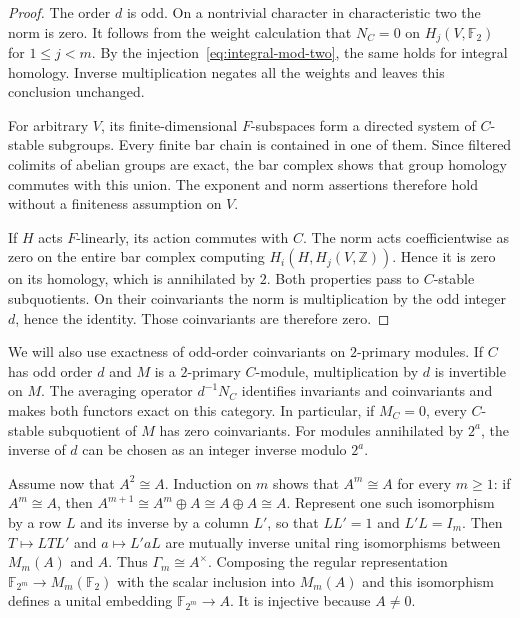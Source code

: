 \documentclass[11pt]{amsart}
\newcommand{\Z}{\mathbb Z}
\newcommand{\F}{\mathbb F}
\theoremstyle{definition}
\theoremstyle{remark}
\numberwithin{equation}{section}
\begin{document}
\begin{proof}
The order $d$ is odd. On a nontrivial character in characteristic two the norm is zero. It follows from the weight calculation that $N_C=0$ on $H_j(V,\F_2)$ for $1\leq j<m$. By the injection~\eqref{eq:integral-mod-two}, the same holds for integral homology. Inverse multiplication negates all the weights and leaves this conclusion unchanged.

For arbitrary $V$, its finite-dimensional $F$-subspaces form a directed system of $C$-stable subgroups. Every finite bar chain is contained in one of them. Since filtered colimits of abelian groups are exact, the bar complex shows that group homology commutes with this union. The exponent and norm assertions therefore hold without a finiteness assumption on $V$.

If $H$ acts $F$-linearly, its action commutes with $C$. The norm acts coefficientwise as zero on the entire bar complex computing $H_i(H,H_j(V,\Z))$. Hence it is zero on its homology, which is annihilated by $2$. Both properties pass to $C$-stable subquotients. On their coinvariants the norm is multiplication by the odd integer $d$, hence the identity. Those coinvariants are therefore zero.
\end{proof}

We will also use exactness of odd-order coinvariants on $2$-primary modules. If $C$ has odd order $d$ and $M$ is a $2$-primary $C$-module, multiplication by $d$ is invertible on $M$. The averaging operator $d^{-1}N_C$ identifies invariants and coinvariants and makes both functors exact on this category. In particular, if $M_C=0$, every $C$-stable subquotient of $M$ has zero coinvariants. For modules annihilated by $2^a$, the inverse of $d$ can be chosen as an integer inverse modulo $2^a$.

Assume now that $A^2\cong A$. Induction on $m$ shows that $A^m\cong A$ for every $m\geq1$: if $A^m\cong A$, then $A^{m+1}\cong A^m\oplus A\cong A\oplus A\cong A$. Represent one such isomorphism by a row $L$ and its inverse by a column $L'$, so that $LL'=1$ and $L'L=I_m$. Then $T\mapsto LTL'$ and $a\mapsto L'aL$ are mutually inverse unital ring isomorphisms between $M_m(A)$ and $A$. Thus $\Gamma_m\cong A^\times$. Composing the regular representation $\F_{2^m}\to M_m(\F_2)$ with the scalar inclusion into $M_m(A)$ and this isomorphism defines a unital embedding $\F_{2^m}\to A$. It is injective because $A\neq0$.
\end{document}
